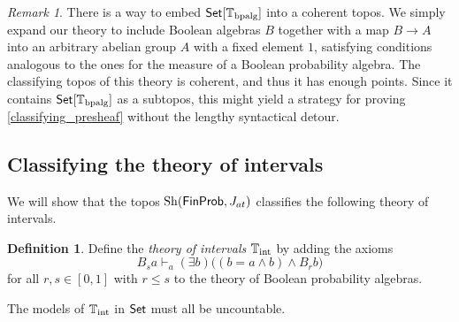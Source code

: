 \documentclass[a4paper]{amsproc}
\theoremstyle{plain}
\theoremstyle{definition}
\newtheorem{definition}[theorem]{Definition}
\theoremstyle{remark}
\newtheorem{remark}[theorem]{Remark}
\numberwithin{equation}{section}
\DeclareMathOperator{\Sh}{Sh}
\newcommand{\Set}{\textup{\textsf{Set}}}
\newcommand{\FinProb}{\textup{\textsf{FinProb}}}
\begin{document}
\begin{remark}
    There is a way to embed $\Set[\mathbb{T}_{\textup{bpalg}}]$ into a coherent topos. We simply expand our theory to include Boolean algebras $B$ together with a map $B \to A$ into an arbitrary abelian group $A$ with a fixed element $1$, satisfying conditions analogous to the ones for the measure of a Boolean probability algebra. The classifying topos of this theory is coherent, and thus it has enough points. Since it contains $\Set[\mathbb{T}_{\textup{bpalg}}]$ as a subtopos, this might yield a strategy for proving \ref{classifying_presheaf} without the lengthy syntactical detour.
\end{remark}

\subsection{Classifying the theory of intervals} \label{theory_of_intervals}

We will show that the topos $\Sh(\FinProb, J_{at})$ classifies the following theory of intervals.


\begin{definition}
    Define the \textit{theory of intervals} $\mathbb{T}_{\textup{int}}$ by adding the axioms
    \[
    B_s a \vdash_a (\exists b) \big ( (b = a \wedge b) \wedge B_r b \big )
    \]
    for all $r,s \in [0,1]$ with $r \leq s$ to the theory of Boolean probability algebras.
\end{definition}

The models of $\mathbb{T}_{\textup{int}}$ in $\Set$ must all be uncountable.
\end{document}
